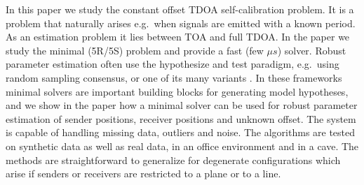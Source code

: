 \documentclass{article}
\begin{document}
  
   
% 
% 
%


In this paper we study the constant offset TDOA self-calibration problem. It is a problem that naturally arises e.g.\ when signals are emitted  with a known period. As an estimation problem it lies between TOA and full TDOA. In the paper we study the minimal (5R/5S) problem and provide a fast (few $\mu s$) solver. 
Robust parameter estimation often use the hypothesize and test paradigm, e.g.\ using random sampling consensus, \cite{fischler-bolles-ca-81} or one of its many variants \cite{chum2003locally,raguram2013usac,korman2018latent}. In these frameworks minimal solvers are important building blocks for generating model hypotheses, and 
we show in the  paper how a minimal solver can be used for robust parameter estimation of sender positions, receiver positions and unknown offset. 
The system is capable of handling missing data, outliers and noise. The algorithms are tested on synthetic data as well as real data,  
in an office environment and in a cave.
%
%
The methods are straightforward to generalize for degenerate configurations which arise if senders or receivers are restricted to a plane or to a line. %
 
\vspace{-5pt}
\end{document}
